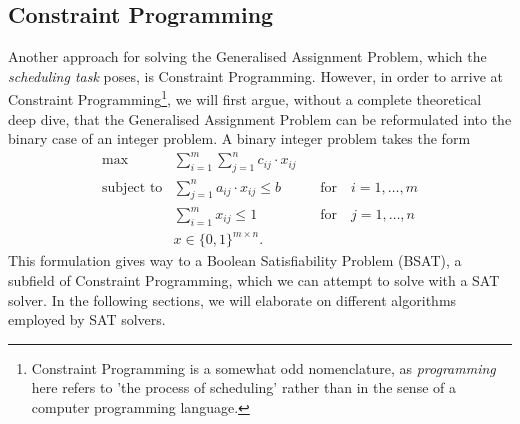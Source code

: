 \subsection{Constraint Programming}
Another approach for solving the Generalised Assignment Problem, which the \textit{scheduling task} poses, is Constraint Programming. However, in order to arrive at Constraint Programming\footnote{Constraint Programming is a somewhat odd nomenclature, as \textit{programming} here refers to 'the process of scheduling' rather than in the sense of a computer programming language.}, we will first argue, without a complete theoretical deep dive, that the Generalised Assignment Problem can be reformulated into the binary case of an integer problem. A binary integer problem takes the form\cite{Integer-Programming-Book} 
\begin{align*}
    \text{max} &\sum_{i = 1}^m \sum_{j = 1}^n c_{ij} \cdot x_{ij}
    \\
    \text{subject to} &\sum_{j = 1}^n a_{ij} \cdot x_{ij} \leq b \qquad &\text{for} \quad i = 1, \hdots, m
    \\
    &\sum_{i = 1}^m x_{ij} \leq 1 \qquad &\text{for} \quad j = 1, \hdots, n
    \\
    &x \in \{0, 1\}^{m \times n}.
\end{align*}
This formulation gives way to a Boolean Satisfiability Problem (BSAT), a subfield of Constraint Programming, which we can attempt to solve with a SAT solver. In the following sections, we will elaborate on different algorithms employed by SAT solvers.

